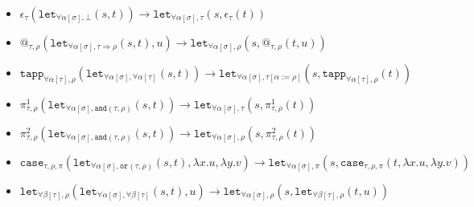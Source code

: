 \documentclass[runningheads,a4paper]{llncs}
\newcommand{\quant}[2]{\forall #1[#2]}
\newcommand{\qquant}[3]{#1 #2[#3]}
\newcommand{\arrtype}{\Rightarrow}
\newcommand{\abs}[2]{\lambda #1.#2}
\begin{document}
\begin{itemize}
\item $\epsilon_\tau(\mathtt{let}_{\qquant{\forall}{\alpha}{\sigma},
  \bot}(s,t)) \to
  \mathtt{let}_{\qquant{\forall}{\alpha}{\sigma},\tau}(s,\epsilon_\tau(t))$
\item $@_{\tau,\rho}(\mathtt{let}_{\qquant{\forall}{\alpha}{\sigma},
  \tau \arrtype \rho}(s,t),u) \to
  \mathtt{let}_{\qquant{\forall}{\alpha}{\sigma},\rho}(s,@_{\tau,\rho}(t,
  u))$
\item $\mathtt{tapp}_{\quant{\alpha}{\tau},\rho}(
\mathtt{let}_{\qquant{\forall}{\alpha}{\sigma},\quant{\alpha}{\tau}}(s,t))
  \to
  \mathtt{let}_{\qquant{\forall}{\alpha}{\sigma},\tau[\alpha:=\rho]}(s,
  \mathtt{tapp}_{\quant{\alpha}{\tau},\rho}(t))$
\item $\pi^1_{\tau,\rho}(\mathtt{let}_{\qquant{\forall}{\alpha}{\sigma},
  \mathtt{and}(\tau,\rho)}(s,t)) \to
  \mathtt{let}_{\qquant{\forall}{\alpha}{\sigma},\tau}(s,\pi^1_{\tau,
  \rho}(t))$
\item $\pi^2_{\tau,\rho}(\mathtt{let}_{\qquant{\forall}{\alpha}{\sigma},
  \mathtt{and}(\tau,\rho)}(s,t)) \to
  \mathtt{let}_{\qquant{\forall}{\alpha}{\sigma},\rho}(s,\pi^2_{\tau,
  \rho}(t))$
\item $\mathtt{case}_{\tau,\rho,\pi}(
  \mathtt{let}_{\qquant{\forall}{\alpha}{\sigma},\mathtt{or}(\tau,
  \rho)}(s,t),\abs{x}{u},\abs{y}{v}) \to
  \mathtt{let}_{\qquant{\forall}{\alpha}{\sigma},\pi}(s,\mathtt{case}_{
  \tau,\rho,\pi}(t,\abs{x}{u},\abs{y}{v}))$
\item $\mathtt{let}_{\qquant{\forall}{\beta}{\tau},\rho}(\mathtt{let}_{\qquant{\forall}{\alpha}{\sigma},\qquant{\forall}{\beta}{\tau}}(s,t),u) \to
  \mathtt{let}_{\qquant{\forall}{\alpha}{\sigma},\rho}(s,\mathtt{let}_{\qquant{\forall}{\beta}{\tau},\rho}(t,u))$
\end{itemize}
\end{document}
